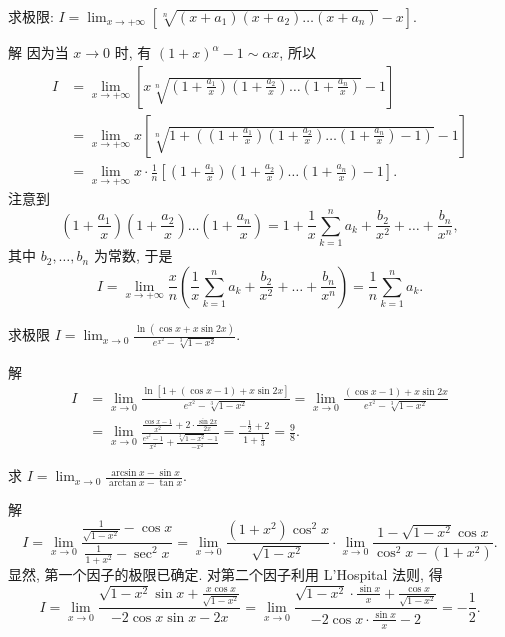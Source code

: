 \documentclass[lang=cn,newtx,10pt,scheme=chinese]{elegantbook}
\begin{document}
\begin{example}
  求极限: $I = \lim_{x \to +\infty} \left[\sqrt[n]{(x + a_1)(x + a_2)\dots(x + a_n)} - x\right]$.
\end{example}
\begin{solution}
  解 因为当 $x \to 0$ 时, 有 $(1 + x)^\alpha - 1 \sim \alpha x$, 所以
  $$
  \begin{aligned}
  I &= \lim_{x \to +\infty} \left[x \sqrt[n]{\left(1 + \frac{a_1}{x}\right)\left(1 + \frac{a_2}{x}\right)\dots\left(1 + \frac{a_n}{x}\right)} - 1\right] \\
  &= \lim_{x \to +\infty} x \left[\sqrt[n]{1 + \left(\left(1 + \frac{a_1}{x}\right)\left(1 + \frac{a_2}{x}\right)\dots\left(1 + \frac{a_n}{x}\right) - 1\right)} - 1\right] \\
  &= \lim_{x \to +\infty} x \cdot \frac{1}{n} \left[\left(1 + \frac{a_1}{x}\right)\left(1 + \frac{a_2}{x}\right)\dots\left(1 + \frac{a_n}{x}\right) - 1\right].
  \end{aligned}
  $$
  注意到
  $$
  \left(1 + \frac{a_1}{x}\right)\left(1 + \frac{a_2}{x}\right)\dots\left(1 + \frac{a_n}{x}\right) = 1 + \frac{1}{x} \sum_{k=1}^n a_k + \frac{b_2}{x^2} + \dots + \frac{b_n}{x^n},
  $$
  其中 $b_2, \dots, b_n$ 为常数, 于是
  $$
  I = \lim_{x \to +\infty} \frac{x}{n} \left(\frac{1}{x} \sum_{k=1}^n a_k + \frac{b_2}{x^2} + \dots + \frac{b_n}{x^n}\right) = \frac{1}{n} \sum_{k=1}^n a_k.
  $$
\end{solution}

\begin{example}
  求极限 $I = \lim_{x \to 0} \frac{\ln(\cos x + x \sin 2x)}{e^{x^2} - \sqrt[3]{1 - x^2}}$.
\end{example}
\begin{solution}
  解
  $$
  \begin{aligned}
  I &= \lim_{x \to 0} \frac{\ln[1 + (\cos x - 1) + x \sin 2x]}{e^{x^2} - \sqrt[3]{1 - x^2}} = \lim_{x \to 0} \frac{(\cos x - 1) + x \sin 2x}{e^{x^2} - \sqrt[3]{1 - x^2}} \\
  &= \lim_{x \to 0} \frac{\frac{\cos x - 1}{x^2} + 2 \cdot \frac{\sin 2x}{2x}}{\frac{e^{x^2} - 1}{x^2} + \frac{\sqrt[3]{1 - x^2} - 1}{-x^2}} = \frac{-\frac{1}{2} + 2}{1 + \frac{1}{3}} = \frac{9}{8}.
  \end{aligned}
  $$
\end{solution}
\begin{example}
  求 $I = \lim_{x \to 0} \frac{\arcsin x - \sin x}{\arctan x - \tan x}$.
\end{example}
\begin{solution}
  解
  $$
  I = \lim_{x \to 0} \frac{\frac{1}{\sqrt{1 - x^2}} - \cos x}{\frac{1}{1 + x^2} - \sec^2 x} = \lim_{x \to 0} \frac{(1 + x^2) \cos^2 x}{\sqrt{1 - x^2}} \cdot \lim_{x \to 0} \frac{1 - \sqrt{1 - x^2} \cos x}{\cos^2 x - (1 + x^2)}.
  $$
  显然, 第一个因子的极限已确定. 对第二个因子利用 L'Hospital 法则, 得
  $$
  I = \lim_{x \to 0} \frac{\sqrt{1 - x^2} \sin x + \frac{x \cos x}{\sqrt{1 - x^2}}}{-2 \cos x \sin x - 2x} = \lim_{x \to 0} \frac{\sqrt{1 - x^2} \cdot \frac{\sin x}{x} + \frac{\cos x}{\sqrt{1 - x^2}}}{-2 \cos x \cdot \frac{\sin x}{x} - 2} = -\frac{1}{2}.
  $$
\end{solution}
\end{document}
